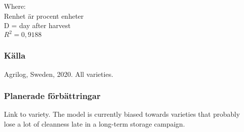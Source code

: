 \documentclass[fleqn]{article}
\begin{document}
  Where:\\
  \hangindent=1.5cm
  Renhet är procent enheter\\
  D = day after harvest\\
  $R^2 = 0,9188$

    \subsubsection{Källa}
    Agrilog, Sweden, 2020. All varieties.
    
    \subsubsection{Planerade förbättringar}
    Link to variety. The model is currently biased towards varieties that probably lose a lot of cleanness late in a long-term storage campaign.

\end{document}
